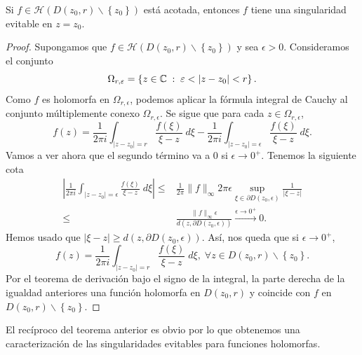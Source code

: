 \begin{theorem}
	Si $\displaystyle f\in\mathcal{H}\left(D\left(z_{0}, r\right)\backslash \left\{ z_{0}\right\} \right) $ está acotada, entonces $\displaystyle f $ tiene una singularidad evitable en $\displaystyle z = z_{0} $.
\end{theorem}
\begin{proof}
	Supongamos que $\displaystyle f \in \mathcal{H}\left(D\left(z_{0}, r\right)\backslash \left\{ z_{0}\right\} \right) $ y sea $\displaystyle \epsilon > 0 $. Consideramos el conjunto
	\[\Omega_{r,\varepsilon }= \left\{ z \in \mathbb{C} \; : \; \varepsilon < \left|z-z_{0}\right|<r\right\}  .\]
	Como $\displaystyle f $ es holomorfa en $\displaystyle \Omega_{r,\epsilon } $, podemos aplicar la fórmula integral de Cauchy al conjunto múltiplemente conexo $\displaystyle \Omega_{r,\epsilon } $. Se sigue que para cada $\displaystyle z \in \Omega_{r,\epsilon } $,
	\[f\left(z\right)=\frac{1}{2\pi i}\int _{ \left|z-z_{0}\right|=r}\frac{f\left(\xi\right)}{\xi-z} \; d\xi-\frac{1}{2\pi i}\int _{ \left|z-z_{0}\right|=\epsilon }\frac{f\left(\xi\right)}{\xi-z} \; d\xi .\]
Vamos a ver ahora que el segundo término va a 0 si $\displaystyle \epsilon \to 0^{+ } $. Tenemos la siguiente cota
\[
\begin{split}
	\left|\frac{1}{2\pi i}\int _{ \left|z-z_{0}\right|= \epsilon }\frac{f\left(\xi\right)}{\xi-z} \; d\xi\right|\leq & \frac{1}{2\pi }\|f\|_{\infty }2\pi \epsilon \sup_{\xi\in \partial D\left(z_{0}, \epsilon \right)}\frac{1}{ \left|\xi-z\right|} \\
	\leq &\frac{\|f\|_{\infty} \epsilon }{d\left(z, \partial D\left(z_{0}, \epsilon \right)\right)} \xrightarrow{\epsilon \to 0^{+}} 0.
\end{split}
\]
Hemos usado que $\displaystyle \left|\xi-z\right|\geq d\left(z, \partial D\left(z_{0}, \epsilon \right)\right) $. Así, nos queda que si $\displaystyle \epsilon \to 0^{+} $, 
\[f\left(z\right)=\frac{1}{2\pi i}\int _{ \left|z-z_{0}\right|=r}\frac{f\left(\xi\right)}{\xi-z} \; d\xi, \; \forall z \in D\left(z_{0}, r\right)\backslash \left\{ z_{0}\right\}  .\]
Por el teorema de derivación bajo el signo de la integral, la parte derecha de la igualdad anteriores una función holomorfa en $\displaystyle D\left(z_{0}, r\right) $ y coincide con $\displaystyle f $ en $\displaystyle D\left(z_{0}, r\right)\backslash \left\{ z_{0}\right\}  $. 
\end{proof}
\begin{observation}
El recíproco del teorema anterior es obvio por lo que obtenemos una caracterización de las singularidades evitables para funciones holomorfas.
\end{observation}

